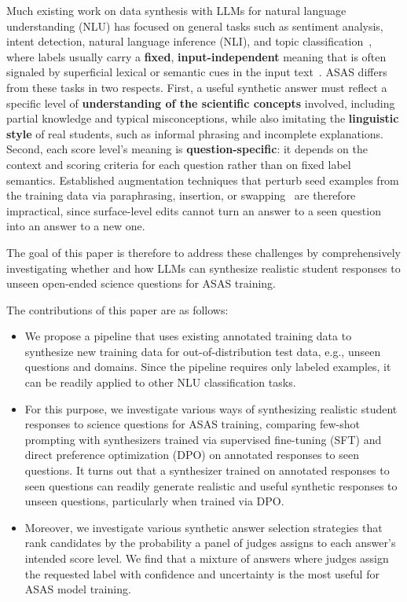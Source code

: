 Much existing work on data synthesis with LLMs for natural language understanding (NLU) has focused on general tasks such as sentiment analysis, intent detection, natural language inference (NLI), and topic classification~\citep{kumarDataAugmentationUsing2020,liSyntheticDataGeneration2023,zouFuseGenPLMFusion2024,ceginRoSERoundrobinSynthetic2025,pecherBetterGeneratorsClassifiers2026}, 
where labels usually carry a \textbf{fixed}, \textbf{input-independent} meaning that is often signaled by superficial lexical or semantic cues in the input text~\citep{joulinBagTricksEfficient2017,gururanganAnnotationArtifactsNatural2018,kaushikLearningDifferenceThat2020}.
ASAS differs from these tasks in two respects.
First, a useful synthetic answer must reflect a specific level of \textbf{understanding of the scientific concepts} involved, including partial knowledge and typical misconceptions, while also imitating the \textbf{linguistic style} of real students, such as informal phrasing and incomplete explanations.
Second, each score level's meaning is \textbf{question-specific}: it depends on the context and scoring criteria for each question rather than on fixed label semantics.
Established augmentation techniques that perturb seed examples from the training data via paraphrasing, insertion, or swapping~\citep{ceginLLMsVsEstablished2025} are therefore impractical, since surface-level edits cannot turn an answer to a seen question into an answer to a new one.

The goal of this paper is therefore to address these challenges by comprehensively investigating whether and how LLMs can synthesize realistic student responses to unseen open-ended science questions for ASAS training.

The contributions of this paper are as follows:
\begin{itemize}
    \item We propose a pipeline that uses existing annotated training data to synthesize new training data for out-of-distribution test data, e.g., unseen questions and domains. Since the pipeline requires only labeled examples, it can be readily applied to other NLU classification tasks.
    \item For this purpose, we investigate various ways of synthesizing realistic student responses to science questions for ASAS training, comparing few-shot prompting with synthesizers trained via supervised fine-tuning (SFT) and direct preference optimization (DPO) on annotated responses to seen questions. It turns out that a synthesizer trained on annotated responses to seen questions can readily generate realistic and useful synthetic responses to unseen questions, particularly when trained via DPO.
    \item Moreover, we investigate various synthetic answer selection strategies that rank candidates by the probability a panel of judges assigns to each answer's intended score level. We find that a mixture of answers where judges assign the requested label with confidence and uncertainty is the most useful for ASAS model training.
\end{itemize}
